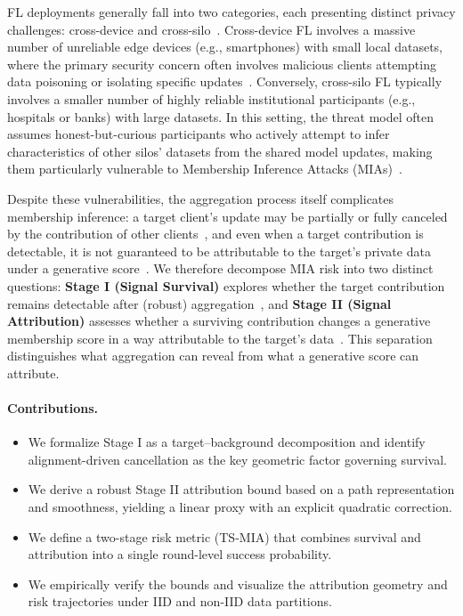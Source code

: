 \documentclass{article}
\theoremstyle{plain}
\theoremstyle{definition}
\theoremstyle{remark}
\numberwithin{theorem}{section}
\numberwithin{definition}{section}
\numberwithin{remark}{section}
\numberwithin{lemma}{section}
\numberwithin{assumption}{section}
\begin{document}
FL deployments generally fall into two categories, each presenting distinct privacy challenges: cross-device and cross-silo~\cite{kairouz2021advances}. Cross-device FL involves a massive number of unreliable edge devices (e.g., smartphones) with small local datasets, where the primary security concern often involves malicious clients attempting data poisoning or isolating specific updates~\cite{mothukuri2021survey}. Conversely, cross-silo FL typically involves a smaller number of highly reliable institutional participants (e.g., hospitals or banks) with large datasets. In this setting, the threat model often assumes honest-but-curious participants who actively attempt to infer characteristics of other silos' datasets from the shared model updates, making them particularly vulnerable to Membership Inference Attacks (MIAs)~\cite{yin2021comprehensive}.

Despite these vulnerabilities, the aggregation process itself complicates membership inference: a target client's update may be partially or fully canceled by the contribution of other clients~\cite{nasr2019comprehensive,melis2019exploiting},
and even when a target contribution is detectable, it is not guaranteed to be attributable to the target's private data under a generative score~\cite{Galende2025Membership,carlini2022membership}.
We therefore decompose MIA risk into two distinct questions:
\textbf{Stage I (Signal Survival)} explores whether the target contribution remains detectable after (robust) aggregation~\cite{zhu2019deep,geiping2020inverting}, and
\textbf{Stage II (Signal Attribution)} assesses whether a surviving contribution changes a generative membership score in a way attributable to the target's data~\cite{Galende2025Membership,carlini2022membership}.
This separation distinguishes what aggregation can reveal from what a generative score can attribute.

\paragraph{Contributions.}
\begin{itemize}[leftmargin=1.5em]
    \item We formalize Stage I as a target--background decomposition and identify alignment-driven cancellation as the key geometric factor governing survival.
    \item We derive a robust Stage II attribution bound based on a path representation and smoothness, yielding a linear proxy with an explicit quadratic correction.
    \item We define a two-stage risk metric (TS-MIA) that combines survival and attribution into a single round-level success probability.
    \item We empirically verify the bounds and visualize the attribution geometry and risk trajectories under IID and non-IID data partitions.
\end{itemize}
\end{document}
